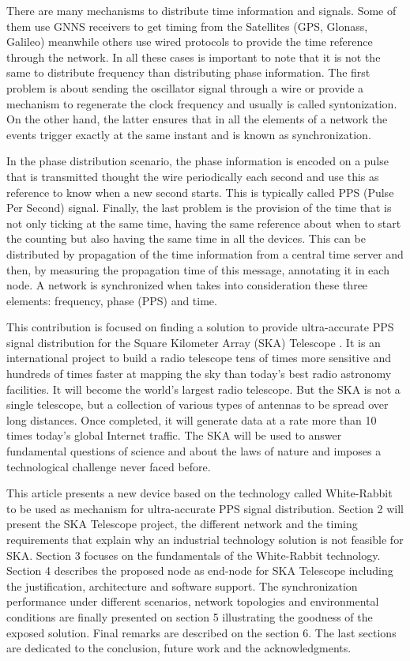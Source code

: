 There are many mechanisms to distribute time information and signals. Some of them use GNNS receivers to get timing from the Satellites (GPS, Glonass, Galileo) meanwhile others use wired protocols to provide the time reference through the network. In all these cases is important to note that it is not the same to distribute frequency than distributing phase information. The first problem is about sending the oscillator signal through a wire or provide a mechanism to regenerate the clock frequency and usually is called syntonization. On the other hand, the latter ensures that in all the elements of a network the events trigger exactly at the same instant and is known as synchronization. 

In the phase distribution scenario, the phase information is encoded on a pulse that is transmitted thought the wire periodically each second and use this as reference to know when a new second starts. This is typically called PPS (Pulse Per Second) signal. Finally, the last problem is the provision of the time that is not only ticking at the same time, having the same reference about when to start the counting but also having the same time in all the devices. This can be distributed by propagation of the time information from a central time server and then, by measuring the propagation time of this message, annotating it in each node. A network is synchronized when takes into consideration these three elements: frequency, phase (PPS) and time.

This contribution is focused on finding a solution to provide ultra-accurate PPS signal distribution for the Square Kilometer Array (SKA) Telescope \cite{ska:project_website}. It is an international project to build a radio telescope tens of times more sensitive and hundreds of times faster at mapping the sky than today’s best radio astronomy facilities. It will become the world’s largest radio telescope. But the SKA is not a single telescope, but a collection of various types of antennas to be spread over long distances. Once completed, it will generate data at a rate more than 10 times today’s global Internet traffic. The SKA will be used to answer fundamental questions of science and about the laws of nature and imposes a technological challenge never faced before. 

This article presents a new device based on the technology called White-Rabbit \cite{ohwr:wr_wiki} to be used as mechanism for ultra-accurate PPS signal distribution. Section 2 will present the SKA Telescope project, the different network and the timing requirements that explain why an industrial technology solution is not feasible for SKA. Section 3 focuses on the fundamentals of the White-Rabbit technology. Section 4 describes the proposed node as end-node for SKA Telescope including the justification, architecture and software support. The synchronization performance under different scenarios, network topologies and environmental conditions are finally presented on section 5 illustrating the goodness of the exposed solution. Final remarks are described on the section 6. The last sections are dedicated to the conclusion, future work and the acknowledgments.